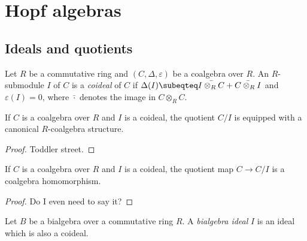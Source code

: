 \section{Hopf algebras}

\subsection{Ideals and quotients}

\begin{definition}[Coideal]
  \label{0-coideal}
  \uses{}

  Let $R$ be a commutative ring and $(C,\Delta,\varepsilon)$ be a coalgebra over $R$. An $R$-submodule $I$ of $C$
  is a \emph{coideal} of $C$ if $\Delta(I) \subeqteq \bar{I \otimes_R C} + \bar{C \otimes_R I}$ and $\varepsilon(I)=0$,
  where $\bar{\cdot}$ denotes the image in $C \otimes_R C$.
\end{definition}

\begin{proposition}
  \label{0-coquot}

  If $C$ is a coalgebra over $R$ and $I$ is a coideal, the quotient $C /I$ is equipped with a canonical
  $R$-coalgebra structure.
\end{proposition}
\begin{proof}
  \uses{}

  Toddler street.
\end{proof}

\begin{proposition}
  \label{0-coquot-hom}

  If $C$ is a coalgebra over $R$ and $I$ is a coideal, the quotient map $C \to C / I$ is a coalgebra homomorphism.
\end{proposition}
\begin{proof}
  \uses{}

  Do I even need to say it?
\end{proof}

\begin{definition}
  \label{0-biideal}

  Let $B$ be a bialgebra over a commutative ring $R$. A \emph{bialgebra ideal} $I$ is an ideal which is also a coideal.
\end{definition}

